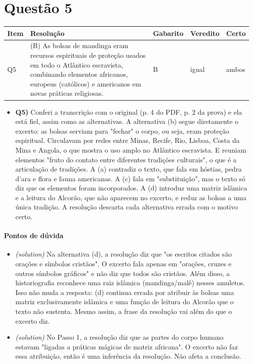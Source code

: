 \documentclass{article}%
\begin{document}
\section*{Questão 5}%
\begin{longtable}{@{}p{} p{} p{} p{} p{}@{}}\toprule Item & Resolução & Gabarito & Veredito & Certo \\ \midrule
Q5 & (B) As bolsas de mandinga eram recursos espirituais de proteção usados em todo o Atlântico escravista, combinando elementos africanos, europeus (católicos) e americanos em novas práticas religiosas. & B & igual & ambos \\
\bottomrule\end{longtable}%
\begin{itemize}%
\item%
\textbf{Q5)} Conferi a transcrição com o original (p. 4 do PDF, p. 2 da prova) e ela está fiel, assim como as alternativas. A alternativa (b) segue diretamente o excerto: as bolsas serviam para "fechar" o corpo, ou seja, eram proteção espiritual. Circulavam por redes entre Minas, Recife, Rio, Lisboa, Costa da Mina e Angola, o que mostra o uso amplo no Atlântico escravista. E reuniam elementos "fruto do contato entre diferentes tradições culturais", o que é a articulação de tradições. A (a) contradiz o texto, que fala em hóstias, pedra d'ara e flora e fauna americanas. A (c) fala em "substituição", mas o texto só diz que os elementos foram incorporados. A (d) introduz uma matriz islâmica e a leitura do Alcorão, que não aparecem no excerto, e reduz as bolsas a uma única tradição. A resolução descarta cada alternativa errada com o motivo certo.%
\end{itemize}%
\paragraph{Pontos de dúvida}%
\begin{itemize}%
\item%
\textit{(solution)} Na alternativa (d), a resolução diz que "os escritos citados são orações e símbolos cristãos". O excerto fala apenas em "orações, cruzes e outros símbolos gráficos" e não diz que todos são cristãos. Além disso, a historiografia reconhece uma raiz islâmica (mandinga/malê) nesses amuletos. Isso não muda a resposta: (d) continua errada por atribuir às bolsas uma matriz exclusivamente islâmica e uma função de leitura do Alcorão que o texto não sustenta. Mesmo assim, a frase da resolução vai além do que o excerto diz.%
\item%
\textit{(solution)} No Passo 1, a resolução diz que as partes do corpo humano estavam "ligadas a práticas mágicas de matriz africana". O excerto não faz essa atribuição, então é uma inferência da resolução. Não afeta a conclusão.%
\end{itemize}%
\end{document}
